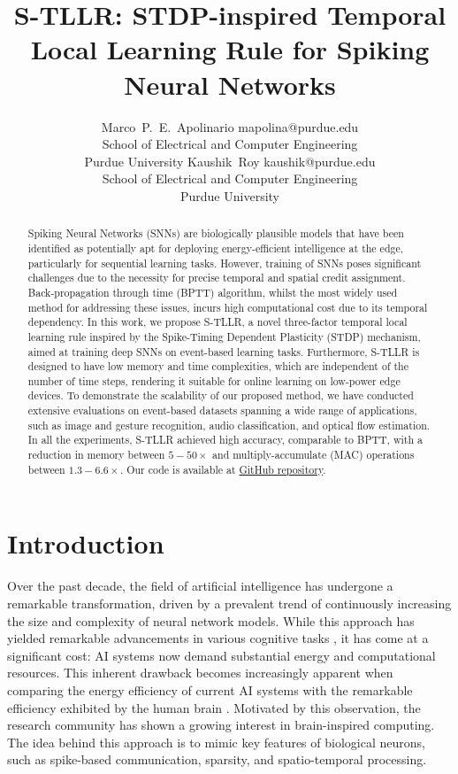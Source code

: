 \documentclass[10pt]{article} %
\title{S-TLLR: STDP-inspired Temporal Local Learning Rule for Spiking Neural Networks}
\author{\name Marco~P.~E.~Apolinario \email mapolina@purdue.edu \\
      \addr School of Electrical and Computer Engineering\\
      Purdue University
      \AND
      \name Kaushik~Roy \email kaushik@purdue.edu \\
      \addr School of Electrical and Computer Engineering \\
      Purdue University
      }
\begin{document}
\maketitle

\begin{abstract}
Spiking Neural Networks (SNNs) are biologically plausible models that have been identified as potentially apt for deploying energy-efficient intelligence at the edge, particularly for sequential learning tasks. 
However, training of SNNs poses significant challenges due to the necessity for precise temporal and spatial credit assignment.
Back-propagation through time (BPTT) algorithm, whilst the most widely used method for addressing these issues, incurs high computational cost due to its temporal dependency.
In this work, we propose S-TLLR, a novel three-factor temporal local learning rule inspired by the Spike-Timing Dependent Plasticity (STDP) mechanism, aimed at training deep SNNs on event-based learning tasks. 
Furthermore, S-TLLR is designed to have low memory and time complexities, which are independent of the number of time steps, rendering it suitable for online learning on low-power edge devices.
To demonstrate the scalability of our proposed method, we have conducted extensive evaluations on event-based datasets spanning a wide range of applications, such as image and gesture recognition, audio classification, and optical flow estimation.
In all the experiments, S-TLLR achieved high accuracy, comparable to BPTT, with a reduction in memory between $5-50\times$ and multiply-accumulate (MAC) operations between $1.3-6.6\times$.
Our code is available at \href{https://github.com/mapolinario94/S-TLLR}{GitHub repository}.
\end{abstract}

\section{Introduction}
    Over the past decade, the field of artificial intelligence has undergone a remarkable transformation, driven by a prevalent trend of continuously increasing the size and complexity of neural network models.
    While this approach has yielded remarkable advancements in various cognitive tasks \citep{Brown2020LanguageLearners, Dosovitskiy2021AnScale}, it has come at a significant cost: AI systems now demand substantial energy and computational resources. 
    This inherent drawback becomes increasingly apparent when comparing the energy efficiency of current AI systems with the remarkable efficiency exhibited by the human brain \citep{Roy2019, Gerstner2014, Christensen20222022Engineering, Eshraghian2023TrainingLearning}.
    Motivated by this observation, the research community has shown a growing interest in brain-inspired computing. 
    The idea behind this approach is to mimic key features of biological neurons, such as spike-based communication, sparsity, and spatio-temporal processing. 
    
\end{document}
